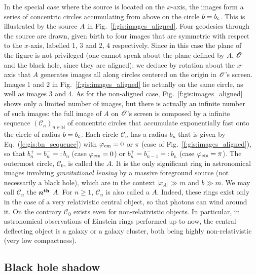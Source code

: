 In the special case where the source is located on the $x$-axis, the images form
a series of concentric circles accumulating from above on the circle
$b = b_{\rm c}$. This is illustrated by the source $A$ in
Fig.~\ref{f:gis:images_aligned}. Four geodesics through the source are drawn,
given birth to four images that
are symmetric with respect to the $x$-axis, labelled 1, 3 and 2, 4 respectively.
Since in this case the plane of the figure is not privileged (one cannot speak
about the plane defined by $A$, $\mathscr{O}$ and the black hole, since they are aligned);
we deduce by rotation about the $x$-axis that $A$ generates images all along
circles centered on the origin in $\mathscr{O}$'s screen. Images 1 and 2 in Fig.~\ref{f:gis:images_aligned}
lie actually on the same circle, as well as images 3 and 4.
As for the non-aligned case, Fig.~\ref{f:gis:images_aligned} shows only a limited number of
images, but there is actually an infinite number of such images: the full image
of $A$ on $\mathscr{O}$'s screen is composed by a infinite sequence $(\mathscr{C}_n)_{n\in\mathbb{N}}$
of concentric circles
that accumulate exponentially fast onto the circle of radius $b = b_{\rm c}$.
Each circle $\mathscr{C}_n$ has a radius $b_n$ that is given
by Eq.~(\ref{e:gis:bn_sequence}) with $\varphi_{\rm em} = 0$ or $\pi$ (case of
Fig.~\ref{f:gis:images_aligned}), so that $b_n^+ = b_n^- =: b_n$ (case $\varphi_{\rm em} = 0$)
or $b_n^+ = b_{n-1}^- =: b_n$ (case $\varphi_{\rm em} = \pi$).
The outermost circle, $\mathscr{C}_0$, is called the
 $A$.
It is the only significant ring in astronomical images involving \emph{gravitational
lensing} by a massive foreground source (not necessarily
a black hole), which are in the context $|x_A|\gg m$ and $b\gg m$.
We may call $\mathscr{C}_n$ the $\bm{n^{\rm th}}$ $A$.
For $n\geq 1$, $\mathscr{C}_n$ is also called a 
$A$. Indeed, these rings exist only in the case of a very relativistic central object, so that
photons can wind around it. On the contrary $\mathscr{C}_0$ exists even for non-relativistic
objects. In particular, in astronomical observations of Einstein rings performed up
to now, the central deflecting object is a galaxy or a galaxy cluster,
both being highly non-relativistic (very low compactness).


\subsection{Black hole shadow}


